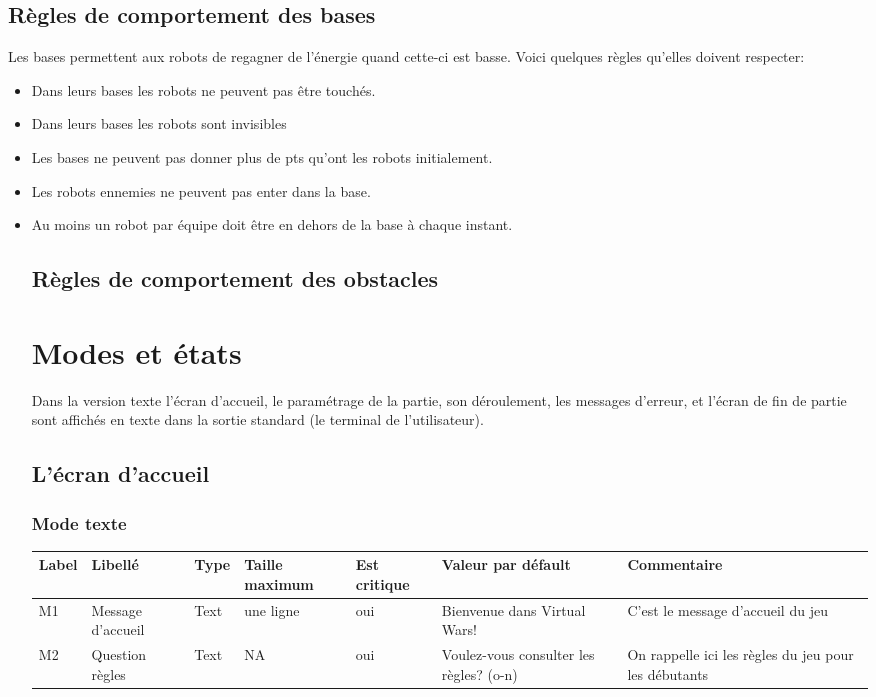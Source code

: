 \documentclass[12pt,a4paper]{article}
\begin{document}
		\subsection{Règles de comportement des bases}
			Les bases permettent aux robots de regagner de l'énergie quand cette-ci est basse. Voici quelques règles qu'elles doivent respecter:
			\begin{itemize}
				\item Dans leurs bases les robots ne peuvent pas être touchés.
				\item Dans leurs bases les robots sont invisibles
				\item Les bases ne peuvent pas donner plus de pts qu'ont les robots initialement.
				\item Les robots ennemies ne peuvent pas enter dans la base.
				\item Au moins un robot par équipe doit être en dehors de la base à chaque instant.
	\subsection{Règles de comportement des obstacles}

	\section{Modes et états}
		Dans la version texte l'écran d'accueil, le paramétrage de la partie, son déroulement, les messages d'erreur, et l'écran de fin de partie sont affichés en texte dans la sortie standard (le terminal de l'utilisateur).
		\subsection{L'écran d'accueil}
			\subsubsection{Mode texte}
					\hspace{-3cm}
					\begin{tabular}{|p{1cm}|p{2.5cm}|p{1.5cm}|p{3cm}|p{2cm}|p{3cm}|p{3cm}|} %
						\hline
							Label & Libellé & Type & Taille maximum & Est critique & Valeur par défault & Commentaire \\
						\hline \hline
							M1 & Message d'accueil & Text & une ligne & oui & Bienvenue dans Virtual Wars! & C'est le message d'accueil du jeu \\
							\hline
							M2 & Question règles & Text & NA & oui & Voulez-vous consulter les règles? (o-n)& On rappelle ici les règles du jeu pour les débutants \\
							\hline
					\end{tabular}
					\label{Information présente sur l'écran d'accueil texte}

\end{itemize}
\end{document}
